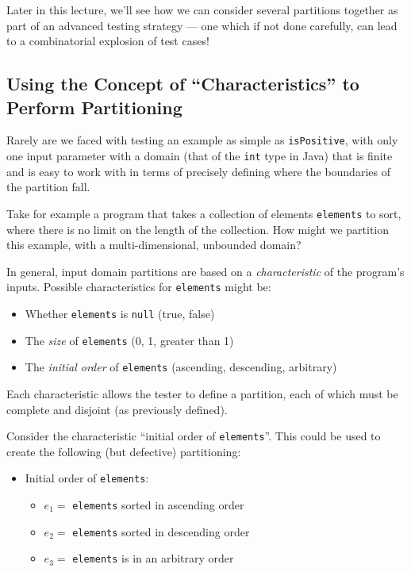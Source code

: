 Later in this lecture, we'll see how we can consider several partitions together
as part of an advanced testing strategy --- one which if not done carefully, can
lead to a combinatorial explosion of test cases! 


\subsection{Using the Concept of ``Characteristics'' to Perform Partitioning}

Rarely are we faced with testing an example as simple as {\tt isPositive}, with
only one input parameter with a domain (that of the {\tt int} type in Java) that
is finite and is easy to work with in terms of precisely defining where the
boundaries of the partition fall.

Take for example a program that takes a collection of elements {\tt elements} to sort,
where there is no limit on the length of the collection. How might we partition
this example, with a multi-dimensional, unbounded domain?

In general, input domain partitions are based on a {\it characteristic} of the
program's inputs. Possible characteristics for {\tt elements} might be:

\begin{itemize}
    \item Whether {\tt elements} is {\tt null} (true, false)
    \item The {\it size} of {\tt elements} (0, 1, greater than 1)
    \item The {\it initial order} of {\tt elements} (ascending, descending, arbitrary)   
\end{itemize}

Each characteristic allows the tester to define a partition, each of which must
be complete and disjoint (as previously defined). 

Consider the characteristic ``initial order of {\tt elements}''.
This could be used to create the following (but defective) partitioning: 

\begin{itemize}
    \item Initial order of {\tt elements}:
    \begin{itemize}
        \item $e_1 =$ {\tt elements} sorted in ascending order
        \item $e_2 =$ {\tt elements} sorted in descending order
        \item $e_3 =$ {\tt elements} is in an arbitrary order
    \end{itemize}
\end{itemize}

